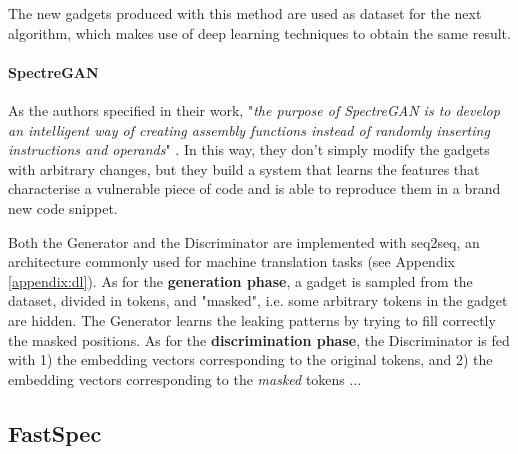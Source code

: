 \documentclass[12pt,a4paper]{book}
\theoremstyle{definition}
\begin{document}
	The new gadgets produced with this method are used as dataset for the next algorithm, which makes use of deep learning techniques to obtain the same result.
	\paragraph{SpectreGAN}
	As the authors specified in their work, "\textit{the purpose of SpectreGAN is to develop an intelligent way of creating assembly functions instead of randomly inserting instructions and operands}" \cite{Tol2021}. In this way, they don't simply modify the gadgets with arbitrary changes, but they build a system that learns the features that characterise a vulnerable piece of code and is able to reproduce them in a brand new code snippet.
	
	Both the Generator and the Discriminator are implemented with seq2seq, an architecture commonly used for machine translation tasks (see Appendix \ref{appendix:dl}). As for the \textbf{generation phase}, a gadget is sampled from the dataset, divided in tokens, and "masked", i.e. some arbitrary tokens in the gadget are hidden. The Generator learns the leaking patterns by trying to fill correctly the masked positions. As for the \textbf{discrimination phase}, the Discriminator is fed with 1) the embedding vectors corresponding to the original tokens, and 2) the embedding vectors corresponding to the \textit{masked} tokens ...
	\subsection{FastSpec}
	
\end{document}
